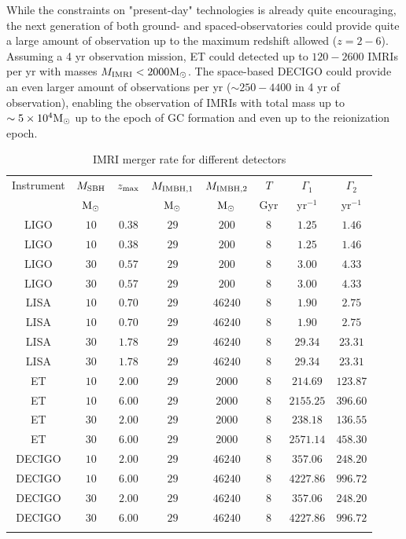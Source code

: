 \documentclass[twocolumn]{aastex62}
\newcommand{\Ms}{{\rm M}_\odot}
\newcommand{\ibh}{{\rm IMBH}}
\newcommand{\imri}{{\rm IMRI}}
\begin{document}
While the constraints on "present-day" technologies is already quite encouraging, the next generation of both ground- and spaced-observatories could provide quite a large amount of observation up to the maximum redshift allowed ($z=2-6$). Assuming a 4 yr observation mission, ET could detected up to $120-2600$ IMRIs per yr with masses $M_\imri < 2000 \Ms$. The space-based DECIGO could provide an even larger amount of observations per yr ($\sim 250-4400$ in 4 yr of observation), enabling the observation of IMRIs with total mass up to $\sim 5\times 10^4\Ms$ up to the epoch of GC formation and even up to the reionization epoch.


\begin{table}
\caption{IMRI merger rate for different detectors}
\begin{center}
\begin{tabular}{cccccccc}
\hline
Instrument & $M_{\rm SBH}$ & $z_{\rm max}$ & $M_{\ibh ,1}$ & $M_{\ibh ,2}$ & $T$ & $\Gamma_1$ & $\Gamma_2$ \\
   & $\Ms$ & &$\Ms$ & $\Ms$ & Gyr & yr$^{-1}$ & yr$^{-1}$ \\ 
\hline
LIGO & $10$ & $0.38$ & $29$ & $200$ & $8$ & $1.25$ &$1.46$ \\
LIGO & $10$ & $0.38$ & $29$ & $200$ & $8$ & $1.25$ &$1.46$ \\
LIGO & $30$ & $0.57$ & $29$ & $200$ & $8$ & $3.00$ &$4.33$ \\
LIGO & $30$ & $0.57$ & $29$ & $200$ & $8$ & $3.00$ &$4.33$ \\
LISA & $10$ & $0.70$ & $29$ & $46240$ & $8$ & $1.90$ &$2.75$ \\
LISA & $10$ & $0.70$ & $29$ & $46240$ & $8$ & $1.90$ &$2.75$ \\
LISA & $30$ & $1.78$ & $29$ & $46240$ & $8$ & $29.34$ &$23.31$ \\
LISA & $30$ & $1.78$ & $29$ & $46240$ & $8$ & $29.34$ &$23.31$ \\
ET & $10$ & $2.00$ & $29$ & $2000$ & $8$ & $214.69$ &$123.87$ \\
ET & $10$ & $6.00$ & $29$ & $2000$ & $8$ & $2155.25$ &$396.60$ \\
ET & $30$ & $2.00$ & $29$ & $2000$ & $8$ & $238.18$ &$136.55$ \\
ET & $30$ & $6.00$ & $29$ & $2000$ & $8$ & $2571.14$ &$458.30$ \\
DECIGO & $10$ & $2.00$ & $29$ & $46240$ & $8$ & $357.06$ &$248.20$ \\
DECIGO & $10$ & $6.00$ & $29$ & $46240$ & $8$ & $4227.86$ &$996.72$ \\
DECIGO & $30$ & $2.00$ & $29$ & $46240$ & $8$ & $357.06$ &$248.20$ \\
DECIGO & $30$ & $6.00$ & $29$ & $46240$ & $8$ & $4227.86$ &$996.72$ \\
\hline
\label{tab:5}
\end{tabular}
\end{center}
\end{table}
\end{document}
